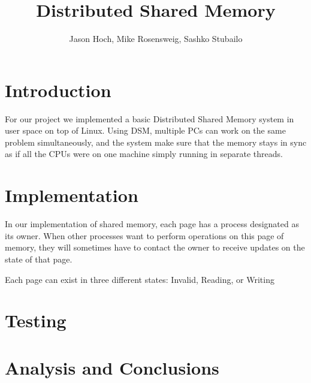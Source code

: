 \documentclass[a4paper,10pt]{article}
\title{Distributed Shared Memory}
\author{Jason Hoch, Mike Rosensweig, Sashko Stubailo}
\begin{document}
\maketitle
\doublespace
\section{Introduction}
For our project we implemented a basic Distributed Shared Memory system in user
space on top of Linux.  Using DSM, multiple PCs can work
on the same problem simultaneously, and the system make sure that the memory
stays in sync as if all the CPUs were on one machine simply running in separate
threads.
\section{Implementation}
In our implementation of shared memory, each page has a process designated as
its owner.  When other processes want to perform operations on this page of
memory, they will sometimes have to contact the owner to receive updates on the
state of that page.

Each page can exist in three different states: Invalid, Reading, or Writing
\section{Testing}

\section{Analysis and Conclusions}
\end{document}
